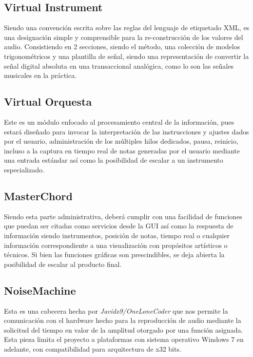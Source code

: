 \documentclass{book}
\begin{document}
	\subsection*{Virtual Instrument}
	Siendo una convención escrita sobre las reglas del lenguaje de etiquetado XML, es una designación simple y comprensible para la re-construcción de los valores del audio. Consistiendo en 2 secciones, siendo el método, una colección de modelos trigonométricos y una plantilla de señal, siendo una representación de convertir la señal digital absoluta en una transaccional analógica, como lo son las señales musicales en la práctica. 
	\pagebreak\subsection*{Virtual Orquesta}
	Este es un módulo enfocado al procesamiento central de la información, pues estará diseñado para invocar la interpretación de las instrucciones y ajustes dados por el usuario, administración de los múltiples hilos dedicados, pausa, reinicio, incluso a la captura en tiempo real de notas generadas por el usuario mediante una entrada estándar así como la posibilidad de escalar a un instrumento especializado.
	\subsection*{MasterChord}
	Siendo esta parte administrativa, deberá cumplir con una facilidad de funciones que puedan ser citadas como servicios desde la GUI así como la respuesta de información siendo instrumentos, posición de notas, tiempo real o cualquier información correspondiente a una visualización con propósitos artísticos o técnicos. Si bien las funciones gráficas son prescindibles, se deja abierta la posibilidad de escalar al producto final.
	\subsection*{NoiseMachine}
	Esta es una cabecera hecha por \emph{Javidx9/OneLoneCoder} que nos permite la comunicación con el hardware hecho para la reproducción de audio mediante la solicitud del tiempo en valor de la amplitud otorgado por una función asignada. Esta pieza limita el proyecto a plataformas con sistema operativo Windows 7 en adelante, con compatibilidad para arquitectura de x32 bits.
\end{document}
